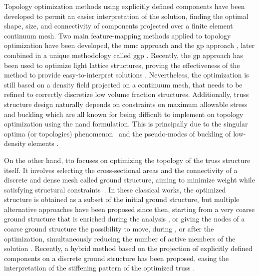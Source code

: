 Topology optimization methods using explicitly defined components have been developed to permit an easier interpretation of the solution, finding the optimal shape, size, and connectivity of components projected over a finite element continuum mesh. Two main feature-mapping methods applied to topology optimization have been developed\cite{wein_review_2020}, the \gls{mmc} approach \cite{guo_doing_2014,zhang_new_2017}
and the \gls{gp} approach \cite{norato_geometry_2015, zhang_geometry_2016}, later combined in a unique methodology called \gls{ggp} \cite{coniglio_generalized_2020}. Recently, the \gls{gp} approach has been used to optimize light lattice structures, proving the effectiveness of the method to provide easy-to-interpret solutions \cite{kazemi_multi-material_2020}. Nevertheless, the optimization is still based on a density field projected on a continuum mesh, that needs to be refined to correctly discretize low volume fraction structures. Additionally, truss structure design naturally depends on constraints on maximum allowable stress and buckling which are all known for being difficult to implement on topology optimization using the \gls{nand} formulation. This is principally due to the singular optima (or topologies) phenomenon~\cite{cheng_-relaxed_1997,rozvany_design-dependent_2001} and the pseudo-modes of buckling of low-density elements \cite{gao_topology_2015}.

On the other hand, \gls{tto} focuses on optimizing the topology of the truss structure itself. It involves selecting the cross-sectional areas and the connectivity of a discrete and dense mesh called ground structure, aiming to minimize weight while satisfying structural constraints~\cite{dorn_automatic_1964, fleron1964minimum}. In these classical works, the optimized structure is obtained as a subset of the initial ground structure, but multiple alternative approaches have been proposed since then, \eg starting from a very coarse ground structure that is enriched during the analysis \cite{gilbert_layout_2003}, or giving the nodes of a coarse ground structure the possibility to move, during \cite{pedersen_optimal_1973, achtziger_simultaneous_2007, descamps_lower-bound_2013}, or after the optimization, simultaneously reducing the number of active members of the solution \cite{he_rationalization_2015, lu_reducing_2023}. Recently, a hybrid method based on the projection of explicitly defined components on a discrete ground structure has been proposed, easing the interpretation of the stiffening pattern of the optimized truss \cite{savine_component-based_2021}.

